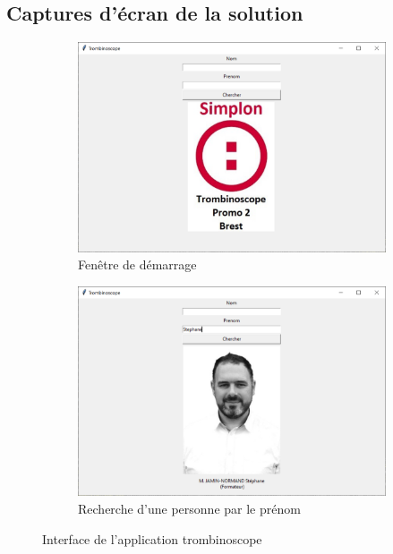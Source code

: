 \documentclass[french]{article}
\begin{document}
\subsection{Captures d'écran de la solution}
\begin{figure}[!htbp]
    \begin{subfigure}[b]{\textwidth}
        \centering
        \includegraphics[scale=0.5]{Image/main_window.PNG}
        \caption{Fenêtre de démarrage}
        \label{fig:mainwindow}
    \end{subfigure}
    \vfill
    \begin{subfigure}[b]{\textwidth}
        \centering
        \includegraphics[scale=0.5]{Image/window_reseach.PNG}
        \caption{Recherche d'une personne par le prénom}
        \label{fig:tb_recherche}
    \end{subfigure}
    \caption{Interface de l'application trombinoscope}
\end{figure}
\end{document}
